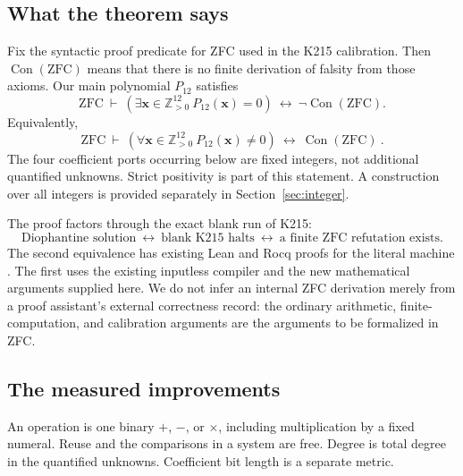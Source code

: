 \documentclass[11pt]{article}
\theoremstyle{remark}\newtheorem{remark}[theorem]{Remark}
\newcommand{\Pos}{\mathbb Z_{>0}}
\newcommand{\Con}{\operatorname{Con}}
\begin{document}
\subsection{What the theorem says}

Fix the syntactic proof predicate for ZFC used in the K215 calibration.
Then \(\Con(\mathrm{ZFC})\) means that there is no finite derivation of
falsity from those axioms. Our main polynomial \(P_{12}\) satisfies
\[
 \mathrm{ZFC}\ \vdash\
 \left(\exists \mathbf x\in\Pos^{12}\ P_{12}(\mathbf x)=0\right)
 \ \longleftrightarrow\
 \neg\Con(\mathrm{ZFC}).
\]
Equivalently,
\begin{equation}\label{eq:main-con}
 \boxed{\ \mathrm{ZFC}\ \vdash\
 \left(\forall \mathbf x\in\Pos^{12}\ P_{12}(\mathbf x)\ne0\right)
 \ \longleftrightarrow\ \Con(\mathrm{ZFC})\ .\ }
\end{equation}
The four coefficient ports occurring below are fixed integers, not
additional quantified unknowns. Strict positivity is part of this
statement. A construction over all integers is provided separately in
Section~\ref{sec:integer}.

The proof factors through the exact blank run of K215:
\[
 \text{Diophantine solution}
 \ \longleftrightarrow\
 \text{blank K215 halts}
 \ \longleftrightarrow\
 \text{a finite ZFC refutation exists}.
\]
The second equivalence has existing Lean and Rocq proofs for the literal
machine \cite{endpoint}. The first uses the existing inputless compiler and the new
mathematical arguments supplied here. We do not infer an internal ZFC
derivation merely from a proof assistant's external correctness record:
the ordinary arithmetic, finite-computation, and calibration arguments
are the arguments to be formalized in ZFC.

\subsection{The measured improvements}

An operation is one binary \(+\), \(-\), or \(\times\), including
multiplication by a fixed numeral. Reuse and the comparisons in a system
are free. Degree is total degree in the quantified unknowns. Coefficient
bit length is a separate metric.
\end{document}
